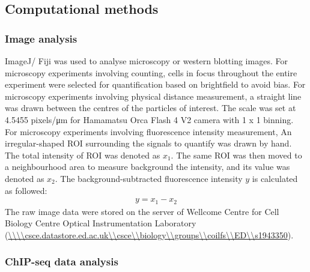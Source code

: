 \subsection{Computational methods}
\subsubsection{Image analysis}
ImageJ/ Fiji was used to analyse microscopy or western blotting images. For microscopy experiments involving counting, cells in focus throughout the entire experiment were selected for quantification based on brightfield to avoid bias. For microscopy experiments involving physical distance measurement, a straight line was drawn between the centres of the particles of interest. The scale was set at 4.5455 pixels/\si{\micro\metre} for Hamamatsu Orca Flash 4 V2 camera with 1 x 1 binning. For microscopy experiments involving fluorescence intensity measurement, An irregular-shaped ROI surrounding the signals to quantify was drawn by hand. The total intensity of ROI was denoted as $x_{1}$. The same ROI was then moved to a neighbourhood area to measure background the intensity, and its value was denoted as $x_{2}$. The background-subtracted fluorescence intensity $y$ is calculated as followed:
\begin{align*}
    y = x_1 - x_2
\end{align*}
The raw image data were stored on the server of Wellcome Centre for Cell Biology Centre Optical Instrumentation Laboratory (\url{\\\\csce.datastore.ed.ac.uk\\csce\\biology\\groups\\coilfs\\ED\\s1943350}). 

\subsubsection{ChIP-seq data analysis}

